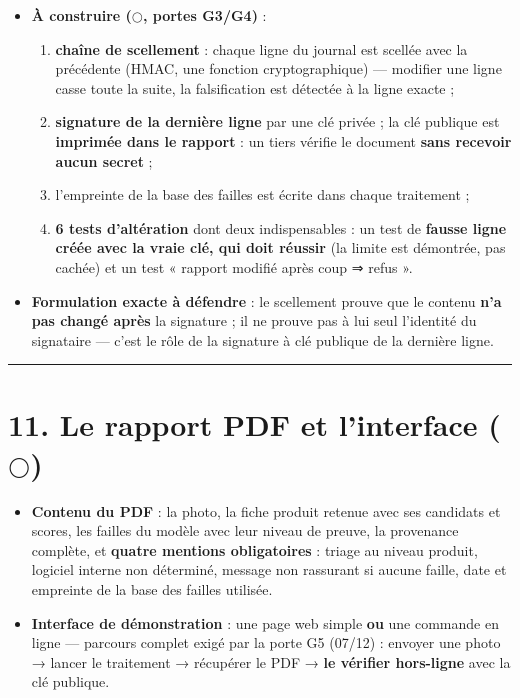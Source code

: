 \documentclass[11pt,a4paper]{article}
\newcommand{\afaire}{\textcolor{orange!85!black}{$\bigcirc$}}  %
\begin{document}
\begin{itemize}
  \item \textbf{À construire (\afaire, portes G3/G4)} :
\begin{enumerate}  \item \textbf{chaîne de scellement} : chaque ligne du journal est scellée avec la précédente (HMAC, une fonction cryptographique) — modifier une ligne casse toute la suite, la falsification est détectée à la ligne exacte ;
  \item \textbf{signature de la dernière ligne} par une clé privée ; la clé publique est \textbf{imprimée dans le rapport} : un tiers vérifie le document \textbf{sans recevoir aucun secret} ;
  \item l'empreinte de la base des failles est écrite dans chaque traitement ;
  \item \textbf{6 tests d'altération} dont deux indispensables : un test de \textbf{fausse ligne créée avec la vraie clé, qui doit réussir} (la limite est démontrée, pas cachée) et un test « rapport modifié après coup ⇒ refus ».
\end{enumerate}
\end{itemize}

\begin{itemize}  \item \textbf{Formulation exacte à défendre} : le scellement prouve que le contenu \textbf{n'a pas changé après} la signature ; il ne prouve pas à lui seul l'identité du signataire — c'est le rôle de la signature à clé publique de la dernière ligne.
\end{itemize}

\medskip\hrule\medskip
\section*{11. Le rapport PDF et l'interface (\afaire)}
\begin{itemize}  \item \textbf{Contenu du PDF} : la photo, la fiche produit retenue avec ses candidats et scores, les failles du modèle avec leur niveau de preuve, la provenance complète, et \textbf{quatre mentions obligatoires} : triage au niveau produit, logiciel interne non déterminé, message non rassurant si aucune faille, date et empreinte de la base des failles utilisée.
\end{itemize}

\begin{itemize}  \item \textbf{Interface de démonstration} : une page web simple \textbf{ou} une commande en ligne — parcours complet exigé par la porte G5 (07/12) : envoyer une photo → lancer le traitement → récupérer le PDF → \textbf{le vérifier hors-ligne} avec la clé publique.
\end{itemize}
\end{document}
